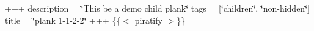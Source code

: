 +++ description = \char`\"{}\+This be a demo child plank\char`\"{} tags = \mbox{[}\char`\"{}children\char`\"{}, \char`\"{}non-\/hidden\char`\"{}\mbox{]} title = \char`\"{}plank 1-\/1-\/2-\/2\char`\"{} +++ \{\{$<$ piratify $>$\}\} 